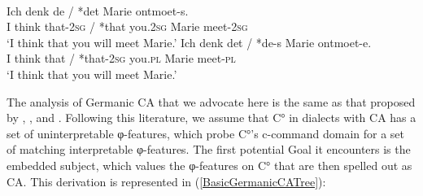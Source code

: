 \documentclass[output=paper
,modfonts
,nonflat
]{langsci/langscibook}
\begin{document}
\ea \label{TegelenDutch} \label{TegelenDutchBasic}
 \\
\begin{xlist}
\ex 
\gll Ich denk de / *det  Marie ontmoet-s.\\
I think that-2\textsc{sg} / *that you.2\textsc{sg} Marie meet-2\textsc{sg} \\
\glt `I think that you will meet Marie.'					
\ex 
\gll Ich denk det\circled{-\O} / *de-s  Marie ontmoet-e. \\
I think that / *that-2\textsc{sg} you.\textsc{pl} Marie meet-\textsc{pl} \\
\glt `I think that you will meet Marie.'	 
\end{xlist}
\z
\noindent The analysis of Germanic CA that we advocate here is the same as that proposed by \citet{Carstens:2003}, \citet{vanKoppen:2005}, and \citet{Haegeman:2012}. Following this literature, we assume that C° in dialects with CA has a set of uninterpretable φ-features, which probe C°’s c-command domain for a set of matching interpretable φ-features. The first potential Goal it encounters is the embedded subject, which values the φ-features on C° that are then spelled out as CA. This derivation is represented in (\ref{BasicGermanicCATree}):
\end{document}
